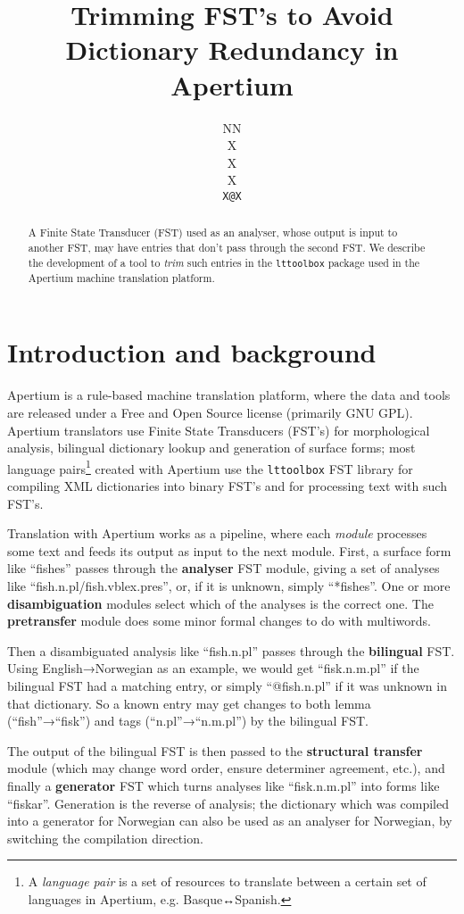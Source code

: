 \documentclass[11pt]{article}
\author{NN\\  X \\ X \\  X \\  {\tt \small   X@X}}
\title{Trimming FST's to Avoid Dictionary Redundancy in Apertium} %
\begin{document}
\maketitle

\begin{abstract}
  A Finite State Transducer (FST) used as an analyser, whose output is
  input to another FST, may have entries that don't pass through the
  second FST. We describe the development of a tool to \emph{trim}
  such entries in the \texttt{lttoolbox} package used in the Apertium
  machine translation platform.
\end{abstract}

\section{Introduction and background}

Apertium\cite{armentano2006ops} is a rule-based machine translation platform, where the data
and tools are released under a Free and Open Source license (primarily
GNU GPL). Apertium translators use Finite State Transducers (FST's)
for morphological analysis, bilingual dictionary lookup and generation
of surface forms; most language pairs\footnote{A \emph{language pair}
  is a set of resources to translate between a certain set of
  languages in Apertium, e.g. Basque↔Spanish.} created with Apertium
use the \texttt{lttoolbox} FST library for compiling XML dictionaries
into binary FST's and for processing text with such FST's.


Translation with Apertium works as a pipeline, where each
\emph{module} processes some text and feeds its output as input to the
next module. First, a surface form like ``fishes'' passes through the
\textbf{analyser} FST module, giving a set of analyses like
``fish.n.pl/fish.vblex.pres'', or, if it is unknown, simply
``*fishes''. One or more \textbf{disambiguation} modules select which
of the analyses is the correct one. The \textbf{pretransfer} module
does some minor formal changes to do with multiwords.

Then a disambiguated analysis like ``fish.n.pl'' passes through the
\textbf{bilingual} FST. Using English→Norwegian as an example, we
would get ``fisk.n.m.pl'' if the bilingual FST had a matching entry,
or simply ``@fish.n.pl'' if it was unknown in that dictionary. So a
known entry may get changes to both lemma (``fish''→``fisk'') and tags
(``n.pl''→``n.m.pl'') by the bilingual FST.

The output of the bilingual FST is then passed to the
\textbf{structural transfer} module (which may change word order,
ensure determiner agreement, etc.), and finally a \textbf{generator}
FST which turns analyses like ``fisk.n.m.pl'' into forms like
``fiskar''. Generation is the reverse of analysis; the dictionary
which was compiled into a generator for Norwegian can also be used as
an analyser for Norwegian, by switching the compilation direction.
\end{document}

